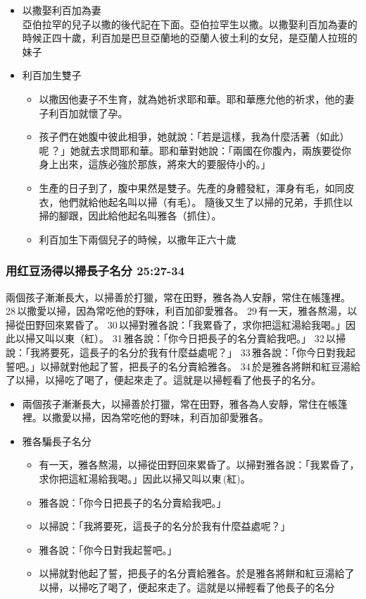\begin{itemize} 
\itemsep-.35em 
\item 以撒娶利百加為妻\\
亞伯拉罕的兒子以撒的後代記在下面。亞伯拉罕生以撒。以撒娶利百加為妻的時候正四十歲，利百加是巴旦亞蘭地的亞蘭人彼土利的女兒，是亞蘭人拉班的妹子 
\item 利百加生雙子
\begin{itemize} 
\itemsep-.35em 
\item 以撒因他妻子不生育，就為她祈求耶和華。耶和華應允他的祈求，他的妻子利百加就懷了孕。 
\item 孩子們在她腹中彼此相爭，她就說：「若是這樣，我為什麼活著（如此）呢 ？」她就去求問耶和華。耶和華對她說：「兩國在你腹內，兩族要從你身上出來，這族必強於那族，將來大的要服侍小的。」 
\item 生產的日子到了，腹中果然是雙子。先產的身體發紅，渾身有毛，如同皮衣，他們就給他起名叫以掃（有毛）。 隨後又生了以掃的兄弟，手抓住以掃的腳跟，因此給他起名叫雅各（抓住）。
\item 利百加生下兩個兒子的時候，以撒年正六十歲
\end{itemize} 
\end{itemize} 

\subsubsection{用红豆汤得以掃長子名分 25:27-34}
\label{sec:YaGePianZhangZiMingFen}
\noindent 
兩個孩子漸漸長大，以掃善於打獵，常在田野，雅各為人安靜，常住在帳篷裡。 28 以撒愛以掃，因為常吃他的野味，利百加卻愛雅各。 29 有一天，雅各熬湯，以掃從田野回來累昏了。 30 以掃對雅各說：「我累昏了，求你把這紅湯給我喝。」因此以掃又叫以東（紅）。 31 雅各說：「你今日把長子的名分賣給我吧。」 32 以掃說：「我將要死，這長子的名分於我有什麼益處呢？」 33 雅各說：「你今日對我起誓吧。」以掃就對他起了誓，把長子的名分賣給雅各。 34 於是雅各將餅和紅豆湯給了以掃，以掃吃了喝了，便起來走了。這就是以掃輕看了他長子的名分。


\begin{itemize} 
\itemsep-.35em 
\item 兩個孩子漸漸長大，以掃善於打獵，常在田野，雅各為人安靜，常住在帳篷裡。以撒愛以掃，因為常吃他的野味，利百加卻愛雅各。 
\item 雅各騙長子名分
\begin{itemize} 
\itemsep-.35em 
\item 有一天，雅各熬湯，以掃從田野回來累昏了。以掃對雅各說：「我累昏了，求你把這紅湯給我喝。」因此以掃又叫以東 (紅)。
\item 雅各說：「你今日把長子的名分賣給我吧。」
\item 以掃說：「我將要死，這長子的名分於我有什麼益處呢？」
\item 雅各說：「你今日對我起誓吧。」
\item 以掃就對他起了誓，把長子的名分賣給雅各。於是雅各將餅和紅豆湯給了以掃，以掃吃了喝了，便起來走了。這就是以掃輕看了他長子的名分
\end{itemize} 
\end{itemize} 

